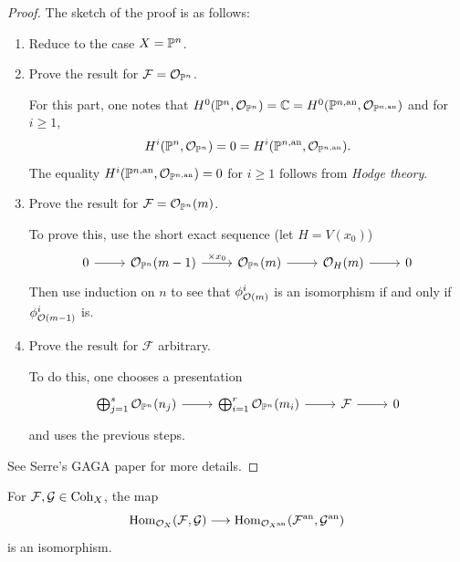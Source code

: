 \begin{proof}
  The sketch of the proof is as follows:
  \begin{enumerate}
    \item[0.] Reduce to the case $X = \mathbb{P}^n$.
    \item Prove the result for
      $\mathcal{F} = \mathcal{O}_{\mathbb{P}^n}$.

      For this part, one notes that
      $H^0(\mathbb{P}^n, \mathcal{O}_{\mathbb{P}^n}) = \mathbb{C} = H^0(\mathbb{P}^{n, \mathrm{an}}, \mathcal{O}_{\mathbb{P}^{n, \mathrm{an}}})$ and
      for $i \ge 1$,
      \[
        H^i(\mathbb{P}^n, \mathcal{O}_{\mathbb{P}^n})
        = 0 = H^i(\mathbb{P}^{n, \mathrm{an}}, \mathcal{O}_{\mathbb{P}^{n, \mathrm{an}}}).
      \]
      The equality
      $H^i(\mathbb{P}^{n, \mathrm{an}}, \mathcal{O}_{\mathbb{P}^{n, \mathrm{an}}}) = 0$ for $i \ge 1$
      follows from \emph{Hodge theory}.
    \item Prove the result for $\mathcal{F} = \mathcal{O}_{\mathbb{P}^n}(m)$.

      To prove this, use the short exact
      sequence (let $H = V(x_0)$)
      \[
        \begin{tikzcd}
          0 \ar[r] & \OO_{\PP^n}(m - 1)
          \ar[r, "\times x_0"]
               & \OO_{\PP^n}(m)
          \ar[r] & \OO_H(m) \ar[r] & 0
        \end{tikzcd}
      \]
      Then use induction
      on $n$ to see that
      $\phi^i_{\mathcal{O}(m)}$ is an isomorphism
      if and only if $\phi^i_{\mathcal{O}(m - 1)}$
      is.
    \item Prove the result for $\mathcal{F}$
      arbitrary.

      To do this, one chooses a presentation
      \[
        \begin{tikzcd}
          \bigoplus_{j = 1}^s \OO_{\PP^n}(n_j)
          \ar[r] & \bigoplus_{i = 1}^r \OO_{\PP^n}(m_i)
          \ar[r] & \mathcal{F} \ar[r] & 0
        \end{tikzcd}
      \]
      and uses the previous steps.
  \end{enumerate}
  See Serre's GAGA paper for more details.
\end{proof}

\begin{theorem}[Theorem B]\label{thm:theorem-b}
  For $\mathcal{F}, \mathcal{G} \in \operatorname{Coh}_X$,
  the map
  \[
    \operatorname{Hom}_{\mathcal{O}_X}(\mathcal{F}, \mathcal{G})
    \longrightarrow \operatorname{Hom}_{\mathcal{O}_{X^{\mathrm{an}}}}(\mathcal{F}^{\mathrm{an}}, \mathcal{G}^{\mathrm{an}})
  \]
  is an isomorphism.
\end{theorem}

